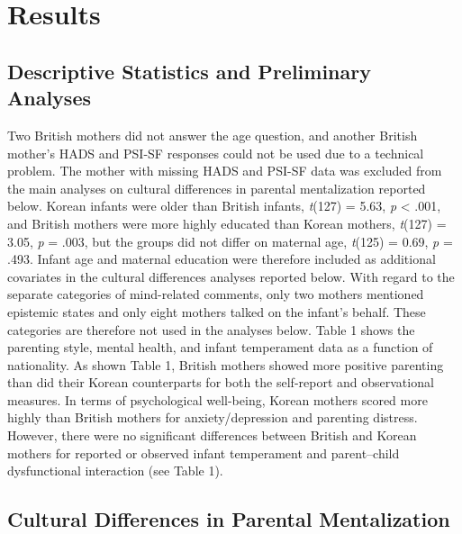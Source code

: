 \documentclass[
]{article}
\begin{document}
\hypertarget{results}{%
\section*{Results}\label{results}}

\hypertarget{descriptive-statistics-and-preliminary-analyses}{%
\subsection*{Descriptive Statistics and Preliminary Analyses}\label{descriptive-statistics-and-preliminary-analyses}}

Two British mothers did not answer the age question, and another British mother's HADS and PSI-SF responses could not be used due to a technical problem. The mother with missing HADS and PSI-SF data was excluded from the main analyses on cultural differences in parental mentalization reported below. Korean infants were older than British infants, \emph{t}(127) = 5.63, \emph{p} \textless{} .001, and British mothers were more highly educated than Korean mothers, \emph{t}(127) = 3.05, \emph{p} = .003, but the groups did not differ on maternal age, \emph{t}(125) = 0.69, \emph{p} = .493. Infant age and maternal education were therefore included as additional covariates in the cultural differences analyses reported below. With regard to the separate categories of mind-related comments, only two mothers mentioned epistemic states and only eight mothers talked on the infant's behalf. These categories are therefore not used in the analyses below. Table 1 shows the parenting style, mental health, and infant temperament data as a function of nationality. As shown Table 1, British mothers showed more positive parenting than did their Korean counterparts for both the self-report and observational measures. In terms of psychological well-being, Korean mothers scored more highly than British mothers for anxiety/depression and parenting distress. However, there were no significant differences between British and Korean mothers for reported or observed infant temperament and parent--child dysfunctional interaction (see Table 1).

\hypertarget{cultural-differences-in-parental-mentalization}{%
\subsection*{Cultural Differences in Parental Mentalization}\label{cultural-differences-in-parental-mentalization}}
\end{document}
